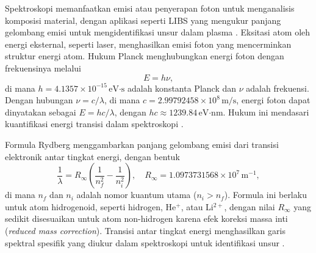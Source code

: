 Spektroskopi memanfaatkan emisi atau penyerapan foton untuk menganalisis komposisi material, dengan aplikasi seperti LIBS yang mengukur panjang gelombang emisi untuk mengidentifikasi unsur dalam plasma \citep{CremersRadzemski2013}. Eksitasi atom oleh energi eksternal, seperti laser, menghasilkan emisi foton yang mencerminkan struktur energi atom. Hukum Planck menghubungkan energi foton dengan frekuensinya melalui
\begin{equation}
E = h\nu, \label{eq:planck}
\end{equation}
di mana \( h = 4.1357 \times 10^{-15} \, \text{eV·s} \) adalah konstanta Planck dan \( \nu \) adalah frekuensi. Dengan hubungan \( \nu = c/\lambda \), di mana \( c = 2.99792458 \times 10^8 \, \text{m/s} \), energi foton dapat dinyatakan sebagai \( E = hc/\lambda \), dengan \( hc \approx 1239.84 \, \text{eV·nm} \). Hukum ini mendasari kuantifikasi energi transisi dalam spektroskopi \citep{Beiser1992}.

Formula Rydberg menggambarkan panjang gelombang emisi dari transisi elektronik antar tingkat energi, dengan bentuk
\begin{equation}
\frac{1}{\lambda} = R_\infty \left( \frac{1}{n_f^2} - \frac{1}{n_i^2} \right), \quad R_\infty = 1.0973731568 \times 10^7 \, \text{m}^{-1}, \label{eq:rydberg}
\end{equation}
di mana \( n_f \) dan \( n_i \) adalah nomor kuantum utama (\( n_i > n_f \)). Formula ini berlaku untuk atom hidrogenoid, seperti hidrogen, He\(^+\), atau Li\(^{2+}\), dengan nilai \( R_\infty \) yang sedikit disesuaikan untuk atom non-hidrogen karena efek koreksi massa inti (\textit{reduced mass correction}). Transisi antar tingkat energi menghasilkan garis spektral spesifik yang diukur dalam spektroskopi untuk identifikasi unsur \citep{Griffiths2005}.

